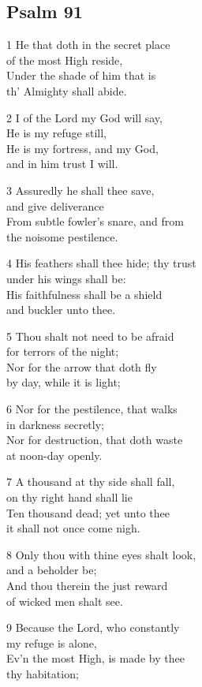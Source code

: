\subsection*{Psalm 91}

1 He that doth in the secret place\\
of the most High reside,\\
Under the shade of him that is\\
th’ Almighty shall abide.

2 I of the Lord my God will say,\\
He is my refuge still,\\
He is my fortress, and my God,\\
and in him trust I will.

3 Assuredly he shall thee save,\\
and give deliverance\\
From subtle fowler’s snare, and from\\
the noisome pestilence.

4 His feathers shall thee hide; thy trust\\
under his wings shall be:\\
His faithfulness shall be a shield\\
and buckler unto thee.

5 Thou shalt not need to be afraid\\
for terrors of the night;\\
Nor for the arrow that doth fly\\
by day, while it is light;

6 Nor for the pestilence, that walks\\
in darkness secretly;\\
Nor for destruction, that doth waste\\
at noon-day openly.

7 A thousand at thy side shall fall,\\
on thy right hand shall lie\\
Ten thousand dead; yet unto thee\\
it shall not once come nigh.

8 Only thou with thine eyes shalt look,\\
and a beholder be;\\
And thou therein the just reward\\
of wicked men shalt see.

9 Because the Lord, who constantly\\
my refuge is alone,\\
Ev’n the most High, is made by thee\\
thy habitation;

